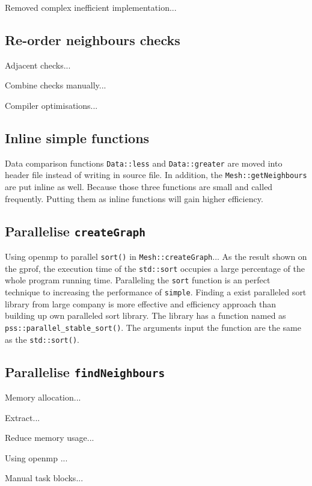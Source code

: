 \documentclass[conference]{IEEEtran}
\begin{document}
Removed complex inefficient implementation...

\subsection{Re-order neighbours checks}

Adjacent checks...

Combine checks manually...

Compiler optimisations...

\subsection{Inline simple functions}

Data comparison functions \texttt{Data::less} and \texttt{Data::greater} are moved into header file instead of writing in source file. In addition, the \texttt{Mesh::getNeighbours} are put inline as well. Because those three functions are small and called frequently. Putting them as inline functions will gain higher efficiency. 

\subsection{Parallelise \texttt{createGraph}}

Using openmp to parallel \texttt{sort()} in \texttt{Mesh::createGraph}...
As the result shown on the gprof, the execution time of the \texttt{std::sort} occupies a large percentage of the whole program running time. Paralleling the \texttt{sort} function is an perfect technique to increasing the performance of \texttt{simple}. Finding a exist paralleled sort library from large company is more effective and efficiency approach than building up own paralleled sort library. \cite{parallelsort} The library has a function named as \texttt{pss::parallel\_stable\_sort()}. The arguments input the function are the same as the \texttt{std::sort()}. 

\subsection{Parallelise \texttt{findNeighbours}}

Memory allocation...

Extract...

Reduce memory usage...

Using openmp \cite{dagum1998openmp}...

Manual task blocks...
\end{document}
